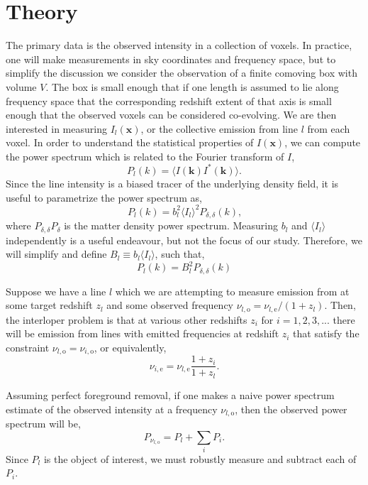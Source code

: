 \documentclass{aastex62}
\newcommand{\beq}{\begin{equation}}
\newcommand{\eeq}{\end{equation}}
\newcommand{\mynu}[2]{\ensuremath{\nu_{#1,\text{#2}}}}
\newcommand{\denps}{\ensuremath{P_{\delta,\delta}}}
\newcommand{\avg}[1]{\ensuremath{\langle #1 \rangle}}
\begin{document}
\section{Theory}\label{sec:theory}
The primary data is the observed intensity in a collection of voxels. In
practice, one will make measurements in sky coordinates and frequency space,
but to simplify the discussion we consider the observation of a finite
comoving box with volume $V$. The box is small enough that if one length is
assumed to lie along frequency space that the corresponding redshift extent of
that axis is small enough that the observed voxels can be considered
co-evolving. We are then interested in measuring $I_{l}(\bm{x})$, or the
collective emission from line $l$ from each voxel. In order to understand the
statistical properties of $I(\bm{x})$, we can compute the power spectrum which
is related to the Fourier transform of $I$,
\beq
P_{l}(k) = \avg{I(\bm{k}) I^{*}(\bm{k})}\text{.}
\eeq
Since the line intensity is a biased tracer of the underlying density field,
it is useful to parametrize the power spectrum as,
\beq
P_l(k) = b_l^2 \avg{I_l}^2 \denps(k)\text{,}
\eeq
where $\denps{P_{\delta}}$ is the matter density power spectrum. Measuring
$b_l$ and $\avg{I_l}$ independently is a useful endeavour, but not the focus
of our study. Therefore, we will simplify and define $B_l \equiv b_l
\avg{I_l}$, such that,
\beq
P_{l}(k) = B_l^2 \denps(k)
\eeq

Suppose we have a line $l$ which we are attempting to measure emission from at
some target redshift $z_l$ and some observed frequency $\mynu{l}{o} =
\mynu{l}{e}/(1+z_l)$. Then, the interloper problem is that at various other
redshifts $z_i$ for $i=1,2,3,...$ there will be emission from lines with
emitted frequencies at redshift $z_i$ that satisfy the constraint $\mynu{l}{o}
= \mynu{i}{o}$, or equivalently,
\beq
\mynu{i}{e} = \mynu{l}{e}\frac{1+z_i}{1+z_l}\text{.}
\eeq

Assuming perfect foreground removal, if one makes a naive power spectrum
estimate of the observed intensity at a frequency $\mynu{l}{o}$, then the
observed power spectrum will be,
\beq\label{eq:observed_with_int}
P_{\mynu{l}{o}} = P_{l} + \sum_{i} P_{i}\text{.}
\eeq
Since $P_l$ is the object of interest, we must robustly measure and subtract
each of $P_i$.
\end{document}
